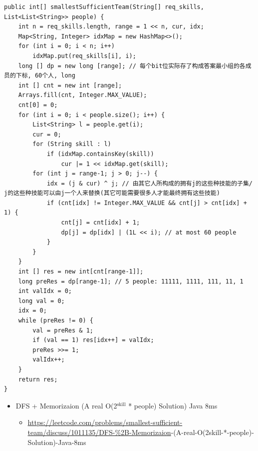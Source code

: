 \documentclass[9pt, b5paaper]{book}
\begin{document}
\begin{verbatim}
public int[] smallestSufficientTeam(String[] req_skills, List<List<String>> people) {
    int n = req_skills.length, range = 1 << n, cur, idx;
    Map<String, Integer> idxMap = new HashMap<>();
    for (int i = 0; i < n; i++) 
        idxMap.put(req_skills[i], i);
    long [] dp = new long [range]; // 每个bit位实际存了构成答案最小组的各成员的下标, 60个人, long
    int [] cnt = new int [range];
    Arrays.fill(cnt, Integer.MAX_VALUE);
    cnt[0] = 0;
    for (int i = 0; i < people.size(); i++) {
        List<String> l = people.get(i);
        cur = 0;
        for (String skill : l) 
            if (idxMap.containsKey(skill))
                cur |= 1 << idxMap.get(skill);
        for (int j = range-1; j > 0; j--) {
            idx = (j & cur) ^ j; // 由其它人所构成的拥有j的这些种技能的子集/ j的这些种技能可以由j一个人来替换(其它可能需要很多人才能最终拥有这些技能)
            if (cnt[idx] != Integer.MAX_VALUE && cnt[j] > cnt[idx] + 1) {
                cnt[j] = cnt[idx] + 1;
                dp[j] = dp[idx] | (1L << i); // at most 60 people
            }
        }
    }
    int [] res = new int[cnt[range-1]];
    long preRes = dp[range-1]; // 5 people: 11111, 1111, 111, 11, 1
    int valIdx = 0;
    long val = 0;
    idx = 0;
    while (preRes != 0) {
        val = preRes & 1;
        if (val == 1) res[idx++] = valIdx;
        preRes >>= 1;
        valIdx++;
    }
    return res;
}
\end{verbatim}
\begin{itemize}
\item DFS + Memorizaion (A real O(2$^{\text{skill}}$ * people) Solution) Java 8ms
\begin{itemize}
\item \url{https://leetcode.com/problems/smallest-sufficient-team/discuss/1011135/DFS-\%2B-Memorizaion}-(A-real-O(2skill-*-people)-Solution)-Java-8ms
\end{itemize}
\end{itemize}
\end{document}
